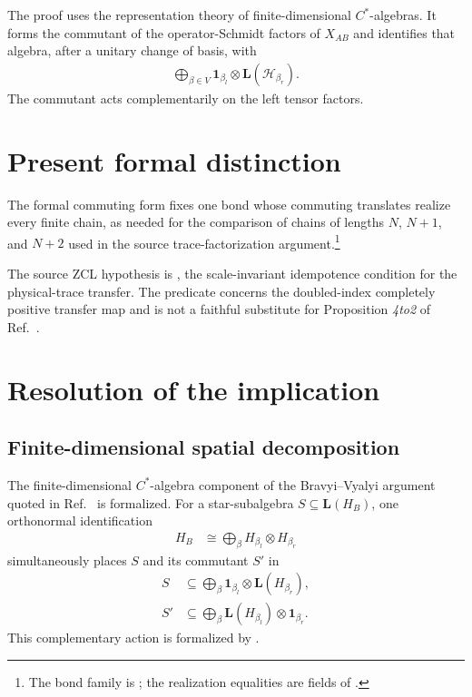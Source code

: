 \documentclass{article}
\begin{document}
The proof uses the representation theory of finite-dimensional
$C^*$-algebras. It forms the commutant of the operator-Schmidt factors of
$X_{AB}$ and identifies that algebra, after a unitary change of basis, with
\begin{align}
    \bigoplus_{\beta\in V}
        \mathbf 1_{\beta_l}\otimes
        \mathbf L(\mathcal H_{\beta_r}).
    \label{eq:cpsv16_commuting_form_to_sal_middle_algebra_normal_form}
\end{align}
The commutant acts complementarily on the left tensor factors.

\section{Present formal distinction}

The formal commuting form fixes one bond whose commuting translates realize
every finite chain, as needed for the comparison of chains of lengths $N$,
$N+1$, and $N+2$ used in the source trace-factorization argument.\footnote{The bond family is
; the realization equalities
are fields of .}

The source ZCL hypothesis is , the
scale-invariant idempotence condition for the physical-trace transfer. The
predicate  concerns the doubled-index completely
positive transfer map and is not a faithful substitute for Proposition
\emph{4to2} of Ref.~\cite{Cirac2016MPDO_arXiv}.

\section{Resolution of the implication}

\subsection{Finite-dimensional spatial decomposition}

The finite-dimensional $C^*$-algebra component of the Bravyi--Vyalyi argument
quoted in Ref.~\cite{Cirac2016MPDO_arXiv} is formalized. For a
star-subalgebra $S\subseteq\mathbf L(H_B)$, one orthonormal identification
\begin{align}
    H_B
        &\cong
        \bigoplus_{\beta}
        H_{\beta_l}\otimes H_{\beta_r}
    \label{eq:cpsv16_commuting_form_to_sal_star_subalgebra_space_decomposition}
\end{align}
simultaneously places $S$ and its commutant $S'$ in
\begin{align}
    S
        &\subseteq
        \bigoplus_\beta
        \mathbf 1_{\beta_l}\otimes\mathbf L(H_{\beta_r}),
    \label{eq:cpsv16_commuting_form_to_sal_star_subalgebra_right_action}\\
    S'
        &\subseteq
        \bigoplus_\beta
        \mathbf L(H_{\beta_l})\otimes\mathbf 1_{\beta_r}.
    \label{eq:cpsv16_commuting_form_to_sal_star_commutant_left_action}
\end{align}
This complementary action is formalized by
.
\end{document}
